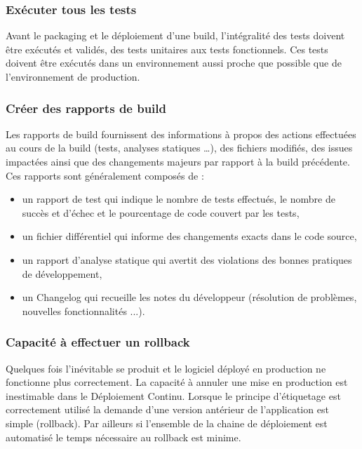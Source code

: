       \subsubsection{Exécuter tous les tests}
      Avant le packaging et le déploiement d’une build, l’intégralité des tests doivent être exécutés et validés, des tests unitaires aux tests fonctionnels. Ces tests doivent être exécutés dans un environnement aussi proche que possible que de l’environnement de production.

      \subsubsection{Créer des rapports de build}
      Les rapports de build fournissent des informations à propos des actions effectuées au cours de la build (tests, analyses statiques …), des fichiers modifiés, des issues impactées ainsi que des changements majeurs par rapport à la build précédente. Ces rapports sont généralement composés de :\\
      \begin{itemize}
        \item un rapport de test qui indique le nombre de tests effectués, le nombre de succès et d’échec et le pourcentage de code couvert par les tests,
        \item un fichier différentiel qui informe des changements exacts dans le code source,
        \item un rapport d’analyse statique qui avertit des violations des bonnes pratiques de développement,
        \item un Changelog qui recueille les notes du développeur (résolution de problèmes, nouvelles fonctionnalités ...).\\
      \end{itemize}

      \subsubsection{Capacité à effectuer un rollback}
      Quelques fois l’inévitable se produit et le logiciel déployé en production ne fonctionne plus correctement. La capacité à annuler une mise en production est inestimable dans le Déploiement Continu. Lorsque le principe d’étiquetage est correctement utilisé la demande d’une version antérieur de l’application est simple (rollback). Par ailleurs si l’ensemble de la chaine de déploiement est automatisé le temps nécessaire au rollback est minime.

